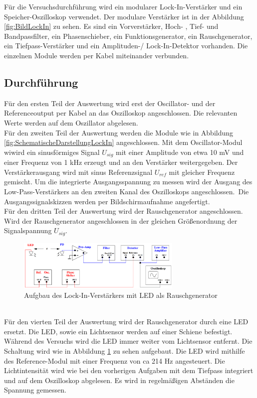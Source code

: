 Für die Versuchsdurchführung wird ein modularer Lock-In-Verstärker und ein Speicher-Oszilloskop verwendet.
Der modulare Verstärker ist in der Abbildung \ref{fig:BildLockIn} zu sehen. Es sind ein Vorverstärker, Hoch-
, Tief- und Bandpassfilter, ein Phasenschieber, ein Funktionsgenerator, ein Rauschgenerator, ein Tiefpass-Verstärker
und ein Amplituden-/ Lock-In-Detektor vorhanden. Die einzelnen Module werden per Kabel miteinander verbunden.

\subsection{Durchführung}
\label{sec:Durchführung}

Für den ersten Teil der Auswertung wird erst der Oscillator- und der Referenceoutput per Kabel an das Oszilloskop angeschlossen. 
Die relevanten Werte werden auf dem Oszillator abgelesen.\\
Für den zweiten Teil der Auswertung werden die Module wie in Abbildung \ref{fig:SchematischeDarstellungLockIn} angeschlossen.
Mit dem Oscillator-Modul wiwird ein sinusförmiges Signal $U_{sig}$ mit einer Amplitude von etwa 10 mV und einer Frequenz von 1 kHz erzeugt
und an den Verstärker weitergegeben. Der Verstärkerausgang wird mit sinus Referenzsignal $U_{ref}$ mit gleicher Frequenz gemischt.
Um die integrierte Ausgangsspannung zu messen wird der Ausgang des Low-Pass-Verstärkers an den zweiten Kanal des Oszilloskops angeschlossen.\
Die Ausgangssignalskizzen werden per Bildschirmaufnahme angefertigt.\\
Für den dritten Teil der Auswertung wird der Rauschgenerator angeschlossen. Wird der Rauschgenerator angeschlossen in der gleichen Größenordnung
der Signalspannung $U_{sig}$.\\
\begin{figure}
    \centering
    \includegraphics[width=0.7\textwidth]{img/LED.png}
    \caption{Aufgbau des Lock-In-Verstärkers mit LED als Rauschgenerator}
    \label{fig:LED}
\end{figure}
\\
Für den vierten Teil der Auswertung wird der Rauschgenerator durch eine LED ersetzt. 
Die LED, sowie ein Lichtsensor werden auf einer Schiene befestigt. Während des Versuchs wird die LED immer weiter vom 
Lichtsensor entfernt.
Die Schaltung wird wie in Abbildung \ref{fig:LED} zu sehen aufgebaut.
Die LED wird mithilfe des Reference-Modul mit einer Frequenz von ca 214 Hz angesteuert.
Die Lichtintensität wird wie bei den vorherigen Aufgaben mit dem Tiefpass integriert und auf dem Oszilloskop abgelesen.
Es wird in regelmäßigen Abständen die Spannung gemessen.\\